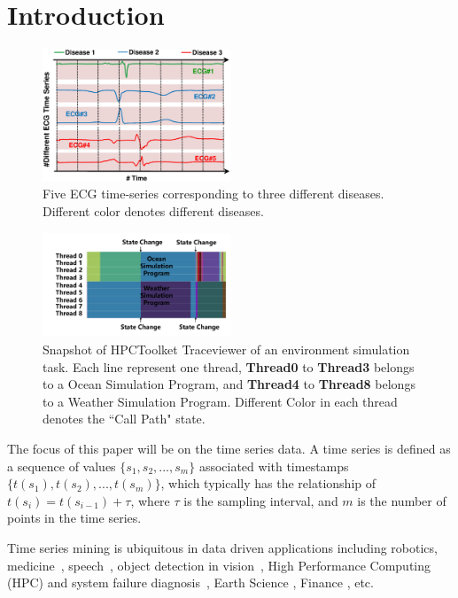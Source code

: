 \section{Introduction}
\label{sec:introduction}

\begin{figure}[t]
\centering
\includegraphics[width=0.5\textwidth]{ECGExp.eps}
\caption{ Five ECG time-series corresponding to three different diseases. Different color denotes different diseases.}
\label{fig:ecgexample}
\end{figure}

\begin{figure}[t]
\centering
\includegraphics[width=0.50\textwidth]{HPCExample.pdf}
\caption{Snapshot of HPCToolket Traceviewer of an environment simulation task.
Each line represent one thread, \textbf{Thread0} to \textbf{Thread3} belongs to a Ocean Simulation Program, and \textbf{Thread4} to \textbf{Thread8} belongs to a Weather Simulation Program. Different Color in each thread denotes the ``Call Path" state.}
\label{fig:hpcexample}
\end{figure}

The focus of this paper will be on the time series data. A time series is defined as a sequence of values $\{s_1,s_2,...,s_m\}$
associated with timestamps $\{t(s_1), t(s_2),..., t(s_m)\}$, which typically has the relationship of $t(s_i) = t(s_{i-1})+\tau$, where $\tau$ is  the sampling interval, and $m$ is the number of points in the time series.

Time series mining is ubiquitous in data driven applications including robotics, medicine~\cite{oates2000method,caracca2000discovering}, speech~\cite{rabiner1993fundamentals}, object detection in vision~\cite{yang2002detecting, sonka2014image}, High Performance Computing (HPC) and system failure diagnosis~\cite{luo2014correlating,sun2014querying}, Earth Science \cite{mudelsee2013climate}, Finance \cite{granger2014forecasting}, etc.

